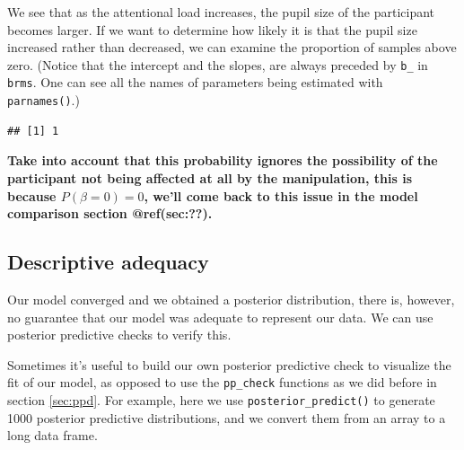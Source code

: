 \documentclass[12pt,]{krantz}
\newenvironment{Shaded}{\begin{snugshade}}{\end{snugshade}}
\newcommand{\DecValTok}[1]{\textcolor[rgb]{0.00,0.00,0.81}{#1}}
\newcommand{\KeywordTok}[1]{\textcolor[rgb]{0.13,0.29,0.53}{\textbf{#1}}}
\newcommand{\NormalTok}[1]{#1}
\newcommand{\OperatorTok}[1]{\textcolor[rgb]{0.81,0.36,0.00}{\textbf{#1}}}
\newcommand{\StringTok}[1]{\textcolor[rgb]{0.31,0.60,0.02}{#1}}
\theoremstyle{definition}
\theoremstyle{definition}
\theoremstyle{definition}
\theoremstyle{remark}
\begin{document}
We see that as the attentional load increases, the pupil size of the participant becomes larger. If we want to determine how likely it is that the pupil size increased rather than decreased, we can examine the proportion of samples above zero. (Notice that the intercept and the slopes, are always preceded by \texttt{b\_} in \texttt{brms}. One can see all the names of parameters being estimated with \texttt{parnames()}.)

\begin{Shaded}
\end{Shaded}

\begin{verbatim}
## [1] 1
\end{verbatim}

\textbf{Take into account that this probability ignores the possibility of the participant not being affected at all by the manipulation, this is because \(P(\beta=0)=0\), we'll come back to this issue in the model comparison section @ref(sec:??).}

\hypertarget{sec:pupiladq}{%
\subsection{Descriptive adequacy}\label{sec:pupiladq}}

Our model converged and we obtained a posterior distribution, there is, however, no guarantee that our model was adequate to represent our data. We can use posterior predictive checks to verify this.

Sometimes it's useful to build our own posterior predictive check to visualize the fit of our model, as opposed to use the \texttt{pp\_check} functions as we did before in section \ref{sec:ppd}. For example, here we use \texttt{posterior\_predict()} to generate 1000 posterior predictive distributions, and we convert them from an array to a long data frame.
\end{document}
